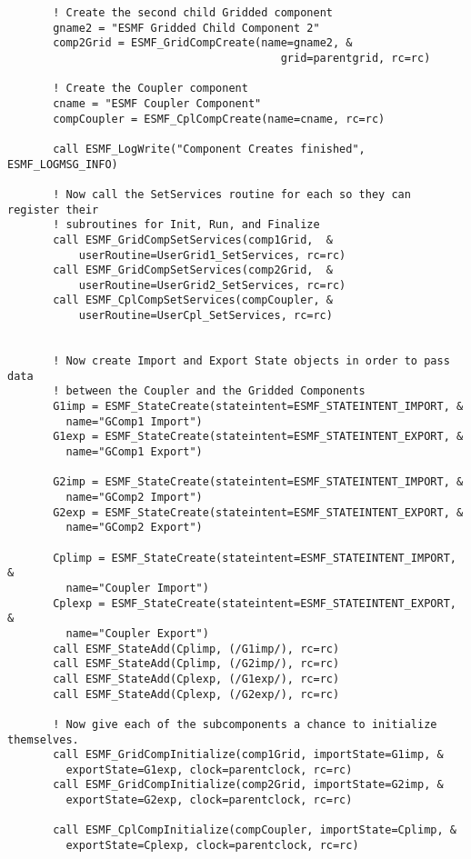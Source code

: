\begin{verbatim}
       ! Create the second child Gridded component
       gname2 = "ESMF Gridded Child Component 2"
       comp2Grid = ESMF_GridCompCreate(name=gname2, &
                                          grid=parentgrid, rc=rc)
 
       ! Create the Coupler component
       cname = "ESMF Coupler Component"
       compCoupler = ESMF_CplCompCreate(name=cname, rc=rc)
 
       call ESMF_LogWrite("Component Creates finished", ESMF_LOGMSG_INFO)
 
       ! Now call the SetServices routine for each so they can register their
       ! subroutines for Init, Run, and Finalize
       call ESMF_GridCompSetServices(comp1Grid,  &
           userRoutine=UserGrid1_SetServices, rc=rc)
       call ESMF_GridCompSetServices(comp2Grid,  &
           userRoutine=UserGrid2_SetServices, rc=rc)
       call ESMF_CplCompSetServices(compCoupler, &
           userRoutine=UserCpl_SetServices, rc=rc)
 
 
       ! Now create Import and Export State objects in order to pass data
       ! between the Coupler and the Gridded Components
       G1imp = ESMF_StateCreate(stateintent=ESMF_STATEINTENT_IMPORT, &
         name="GComp1 Import")
       G1exp = ESMF_StateCreate(stateintent=ESMF_STATEINTENT_EXPORT, &
         name="GComp1 Export")
 
       G2imp = ESMF_StateCreate(stateintent=ESMF_STATEINTENT_IMPORT, &
         name="GComp2 Import")
       G2exp = ESMF_StateCreate(stateintent=ESMF_STATEINTENT_EXPORT, &
         name="GComp2 Export")
 
       Cplimp = ESMF_StateCreate(stateintent=ESMF_STATEINTENT_IMPORT, &
         name="Coupler Import")
       Cplexp = ESMF_StateCreate(stateintent=ESMF_STATEINTENT_EXPORT, &
         name="Coupler Export")
       call ESMF_StateAdd(Cplimp, (/G1imp/), rc=rc)
       call ESMF_StateAdd(Cplimp, (/G2imp/), rc=rc)
       call ESMF_StateAdd(Cplexp, (/G1exp/), rc=rc)
       call ESMF_StateAdd(Cplexp, (/G2exp/), rc=rc)
 
       ! Now give each of the subcomponents a chance to initialize themselves.
       call ESMF_GridCompInitialize(comp1Grid, importState=G1imp, &
         exportState=G1exp, clock=parentclock, rc=rc)
       call ESMF_GridCompInitialize(comp2Grid, importState=G2imp, &
         exportState=G2exp, clock=parentclock, rc=rc)
 
       call ESMF_CplCompInitialize(compCoupler, importState=Cplimp, &
         exportState=Cplexp, clock=parentclock, rc=rc)
 

\end{verbatim}
